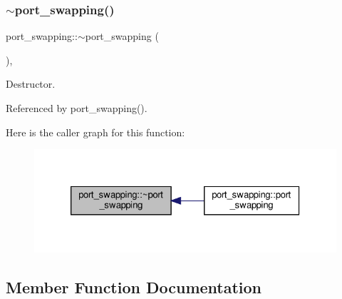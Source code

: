\subsubsection{\texorpdfstring{$\sim$port\+\_\+swapping()}{~port\_swapping()}}
{\footnotesize\ttfamily port\+\_\+swapping\+::$\sim$port\+\_\+swapping (\begin{DoxyParamCaption}{ }\end{DoxyParamCaption})\hspace{0.3cm}{\ttfamily [override]}, {\ttfamily [default]}}



Destructor. 



Referenced by port\+\_\+swapping().

Here is the caller graph for this function\+:
\nopagebreak
\begin{figure}[H]
\begin{center}
\leavevmode
\includegraphics[width=326pt]{d6/d83/classport__swapping_a8830702aef347ef2f566ffd3f9f08a1c_icgraph}
\end{center}
\end{figure}


\subsection{Member Function Documentation}
\mbox{\label{classport__swapping_a5749b47ab0a486ca886beda910015b9e}} 
